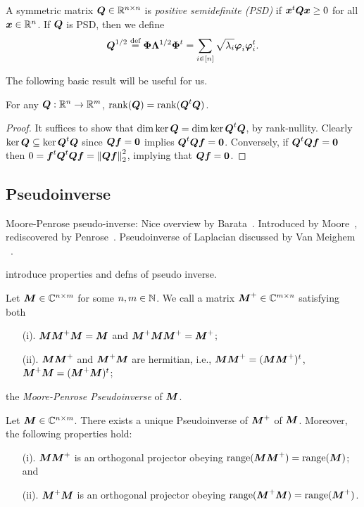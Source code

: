 A symmetric matrix $\vb*{Q}\in\mathbb{R}^{n\times n}$ is \emph{positive semidefinite (PSD)} if $\vb*{x}^t\vb*{Q}\vb*{x} \geq 0$ for all $\vb*{x}\in\mathbb{R}^n$. If $\vb*{Q}$ is PSD, then we define 
\begin{equation*}
    \vb*{Q}^{1/2} \overset{\text{def}}{=} \boldsymbol{\Phi}\vb{\Lambda}^{1/2}\boldsymbol{\Phi}^t = \sum_{i\in[n]}\sqrt{\lambda_i}\vb*{\varphi}_i\vb*{\varphi}_i^t.
\end{equation*}

The following basic result will be useful for us. 

\begin{lemma}
	\label{lem:rank(QtQ)}
	For any $\vb*{Q}:\mathbb{R}^n\to\mathbb{R}^m$, $\rank(\vb*{Q}) = \rank(\vb*{Q}^t\vb*{Q})$. 
\end{lemma}
\begin{proof}
	It suffices to show that $\dim\ker\vb*{Q} = \dim\ker\vb*{Q}^t \vb*{Q}$, by rank-nullity. Clearly $\ker\vb*{Q} \subseteq \ker\vb*{Q}^t\vb*{Q}$ since $\vb*{Q}\vb*{f}=\vb{0}$ implies $\vb*{Q}^t\vb*{Q}\vb*{f}=\vb{0}$. Conversely, if $\vb*{Q}^t\vb*{Q}\vb*{f}=\vb{0}$ then $0=\vb*{f}^t \vb*{Q}^t \vb*{Q}\vb*{f} = \norm{\vb*{Q}\vb*{f}}_2^2$, implying that $\vb*{Q}\vb*{f}=\vb{0}$.  
\end{proof}

\subsection{Pseudoinverse}
\label{sec:background_pseudoinverse}
Moore-Penrose pseudo-inverse: Nice overview by Barata~\cite{barata2012moore}. Introduced by Moore~\cite{moore1920reciprocal}, rediscovered by Penrose~\cite{penrose1955generalized,penrose1956best}. Pseudoinverse of Laplacian discussed by Van Meighem \etal~\cite{van2017pseudoinverse}. 

\TODO introduce properties and defns of pseudo inverse.

\begin{definition}
\label{def:pseudoinverse}
Let ${\vb*{M}}\in\mathbb{C}^{n\times m}$ for some $n,m\in\mathbb{N}$. We call a matrix ${\vb*{M}}^+\in\mathbb{C}^{m\times n}$ satisfying both
\begin{enumerate}
    \item[(i).] ${\vb*{M}}{\vb*{M}}^+{\vb*{M}}={\vb*{M}}$ and ${\vb*{M}}^+{\vb*{M}}{\vb*{M}}^+={\vb*{M}}^+$;
    \item[(ii).] ${\vb*{M}}{\vb*{M}}^+$ and ${\vb*{M}}^+{\vb*{M}}$ are hermitian, i.e., ${\vb*{M}}{\vb*{M}}^+=({\vb*{M}}{\vb*{M}}^+)^t $, ${\vb*{M}}^+{\vb*{M}}=({\vb*{M}}^+{\vb*{M}})^t$; 
\end{enumerate}
the \emph{Moore-Penrose Pseudoinverse} of ${\vb*{M}}$. 
\end{definition}

\begin{lemma}
Let ${\vb*{M}}\in \mathbb{C}^{n\times m}$. There exists a unique Pseudoinverse of ${\vb*{M}}^+$ of ${\vb*{M}}$. Moreover, the following properties hold: 
\begin{enumerate}
    \item[(i).] ${\vb*{M}}{\vb*{M}}^+$ is an orthogonal projector obeying $\textnormal{range}({\vb*{M}}{\vb*{M}}^+)=\textnormal{range}({\vb*{M}})$; and 
    \item[(ii).] ${\vb*{M}}^+{\vb*{M}}$ is an orthogonal projector obeying $\textnormal{range}({\vb*{M}}^+{\vb*{M}})=\textnormal{range}({\vb*{M}}^+)$. 
\end{enumerate}
\end{lemma}

